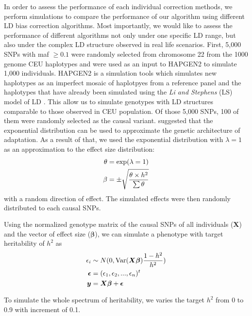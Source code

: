 \documentclass[12pt]{scrbook}
\begin{document}
In order to assess the performance of each individual correction methods, we perform simulations to compare the performance of our algorithm using different \gls{LD} bias correction algorithms.
Most importantly, we would like to assess the performance of different algorithms not only under one specific \gls{LD} range, but also under the complex \gls{LD} structure observed in real life scenarios.
First, 5,000 \glspl{SNP} with \gls{maf} $\ge0.1$ were randomly selected from chromosome 22 from the 1000 genome \gls{CEU} haplotypes and were used as an input to HAPGEN2 \citep{Su2011} to simulate 1,000 individuals.
HAPGEN2 is a simulation tools which simulates new haplotypes as an imperfect mosaic of haplotpyes from a reference panel and the haplotypes that have already been simulated using the \textit{Li and Stephens} (LS) model of \gls{LD} \citep{Li2003}.
This allow us to simulate genotypes with \gls{LD} structures comparable to those observed in \gls{CEU} population. 
Of those 5,000 \glspl{SNP}, 100 of them were randomly selected as the causal variant. 
\citet{Orr1998} suggested that the exponential distribution can be used to approximate the genetic architecture of adaptation. 
As a result of that, we used the exponential distribution with $\lambda=1$ as an approximation to the effect size distribution:
\begin{align}
\theta&=\mathrm{exp}(\lambda=1)\notag\\
\beta&=\pm\sqrt{\frac{\theta \times h^2}{\sum \theta}}
\label{eq:randomEffect}
\end{align}
with a random direction of effect.
The simulated effects were then randomly distributed to each causal \glspl{SNP}.

Using the normalized genotype matrix of the causal \glspl{SNP} of all individuals ($\boldsymbol{X}$) and the vector of effect size ($\boldsymbol{\beta}$), we can simulate a phenotype with target heritability of $h^2$ as
\begin{align}
\epsilon_i&\sim N(0,\mathrm{Var}(\boldsymbol{X\beta})\frac{1-h^2}{h^2} )\notag\\
\boldsymbol{\epsilon} &= (\epsilon_1,\epsilon_2,...,\epsilon_n)^t\notag\\
\boldsymbol{y} &= \boldsymbol{X\beta}+\boldsymbol{\epsilon}
\label{eq:simulationOfPhenotype}
\end{align}

To simulate the whole spectrum of heritability, we varies the target $h^2$ from 0 to 0.9 with increment of 0.1.
\end{document}
